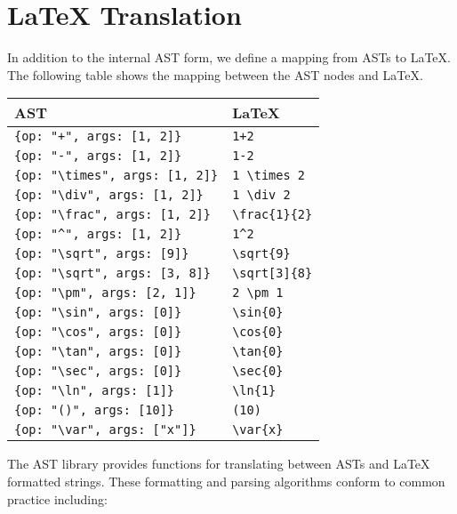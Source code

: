 \documentclass{article}
\newcommand{\var}[1]{\emph{#1}}
\begin{document}
\pagebreak

\section{LaTeX Translation}

In addition to the internal AST form, we define a mapping from ASTs to LaTeX. The following table 
shows the mapping between the AST nodes and LaTeX.

\vspace{20pt}

\begin{tabular}{ | l | l |}
\hline
{\bf AST}                           & {\bf LaTeX} \\ \hline
\verb'{op: "+", args: [1, 2]}'      & \verb'1+2' \\ \hline
\verb'{op: "-", args: [1, 2]}'      & \verb'1-2' \\ \hline
\verb'{op: "\times", args: [1, 2]}' & \verb'1 \times 2' \\ \hline
\verb'{op: "\div", args: [1, 2]}'   & \verb'1 \div 2' \\ \hline
\verb'{op: "\frac", args: [1, 2]}'  & \verb'\frac{1}{2}' \\ \hline
\verb'{op: "^", args: [1, 2]}'      & \verb'1^2' \\ \hline
\verb'{op: "\sqrt", args: [9]}'     & \verb'\sqrt{9}' \\ \hline
\verb'{op: "\sqrt", args: [3, 8]}'  & \verb'\sqrt[3]{8}' \\ \hline
\verb'{op: "\pm", args: [2, 1]}'    & \verb'2 \pm 1' \\ \hline
\verb'{op: "\sin", args: [0]}'      & \verb'\sin{0}' \\ \hline
\verb'{op: "\cos", args: [0]}'      & \verb'\cos{0}' \\ \hline
\verb'{op: "\tan", args: [0]}'      & \verb'\tan{0}' \\ \hline
\verb'{op: "\sec", args: [0]}'      & \verb'\sec{0}' \\ \hline
\verb'{op: "\ln", args: [1]}'       & \verb'\ln{1}' \\ \hline
\verb'{op: "()", args: [10]}'       & \verb'(10)' \\ \hline
\verb'{op: "\var", args: ["x"]}'    & \verb'\var{x}' \\ \hline
\end{tabular}


\vspace{20pt}

The AST library provides functions for translating between ASTs and LaTeX formatted strings. 
These formatting and parsing algorithms conform to common practice including:
\end{document}
